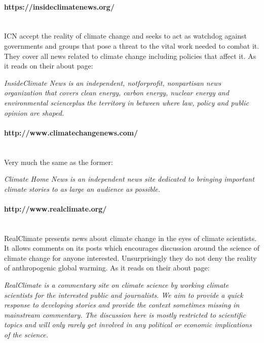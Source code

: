 \documentclass[11pt]{article}
\begin{document}
\paragraph{https://insideclimatenews.org/} \hspace{0pt} \\
ICN accept the reality of climate change and seeks to act as watchdog against
governments and groups that pose a threat to the vital work needed to combat it.
They cover all news related to climate change including policies that affect it.
As it reads on their about page:

\begin{displayquote}
\textit{InsideClimate News is an independent, not\-for\-profit, non\-partisan news organization
that covers clean energy, carbon energy, nuclear energy and environmental science\-plus
the territory in between where law, policy and public opinion are shaped.}
\end{displayquote}

\paragraph{http://www.climatechangenews.com/} \hspace{0pt} \\
Very much the same as the former:

\begin{displayquote}
\textit{Climate Home News is an independent news site dedicated to bringing important climate
stories to as large an audience as possible.}
\end{displayquote}


\paragraph{http://www.realclimate.org/} \hspace{0pt} \\
RealClimate presents news about climate change in the eyes of climate scientists. It
allows comments on its posts which encourages discussion around the science of
climate change for anyone interested. Unsurprisingly they do not deny the reality of
anthropogenic global warming.  As it reads on their about page:

\begin{displayquote}
\textit{RealClimate is a commentary site on climate science by working climate scientists for
the interested public and journalists. We aim to provide a quick response to developing
stories and provide the context sometimes missing in mainstream commentary. The
discussion here is mostly restricted to scientific topics and will only rarely get
involved in any political or economic implications of the science.}
\end{displayquote}
\end{document}
